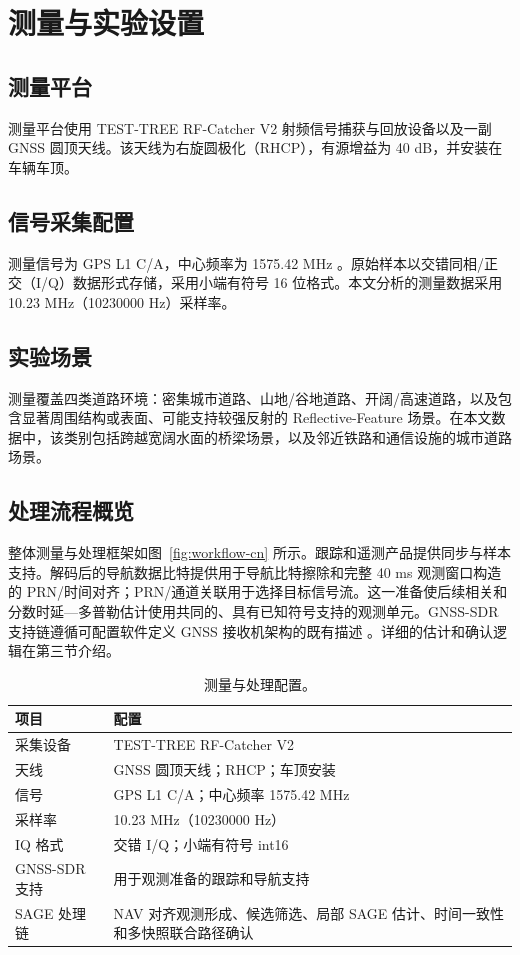 \documentclass[conference]{IEEEtran}
\begin{document}
\section{测量与实验设置}
\subsection{测量平台}
测量平台使用 TEST-TREE RF-Catcher V2 射频信号捕获与回放设备以及一副 GNSS 圆顶天线。该天线为右旋圆极化（RHCP），有源增益为 40 dB，并安装在车辆车顶。

\subsection{信号采集配置}
测量信号为 GPS L1 C/A，中心频率为 1575.42 MHz \cite{gpsis200n2022}。原始样本以交错同相/正交（I/Q）数据形式存储，采用小端有符号 16 位格式。本文分析的测量数据采用 10.23 MHz（10230000 Hz）采样率。

\subsection{实验场景}
测量覆盖四类道路环境：密集城市道路、山地/谷地道路、开阔/高速道路，以及包含显著周围结构或表面、可能支持较强反射的 Reflective-Feature 场景。在本文数据中，该类别包括跨越宽阔水面的桥梁场景，以及邻近铁路和通信设施的城市道路场景。

\subsection{处理流程概览}
整体测量与处理框架如图~\ref{fig:workflow-cn} 所示。跟踪和遥测产品提供同步与样本支持。解码后的导航数据比特提供用于导航比特擦除和完整 40 ms 观测窗口构造的 PRN/时间对齐；PRN/通道关联用于选择目标信号流。这一准备使后续相关和分数时延—多普勒估计使用共同的、具有已知符号支持的观测单元。GNSS-SDR 支持链遵循可配置软件定义 GNSS 接收机架构的既有描述 \cite{fernandez2011gnsssdr}。详细的估计和确认逻辑在第三节介绍。

\begin{table}[t]
\centering
\caption{测量与处理配置。}
\label{tab:measurement-configuration-cn}
\scriptsize
\setlength{\tabcolsep}{3pt}
\begin{tabular}{p{}p{}}
\toprule
项目 & 配置\\
\midrule
采集设备 & TEST-TREE RF-Catcher V2\\
天线 & GNSS 圆顶天线；RHCP；车顶安装\\
信号 & GPS L1 C/A；中心频率 1575.42 MHz\\
采样率 & 10.23 MHz（10230000 Hz）\\
IQ 格式 & 交错 I/Q；小端有符号 int16\\
GNSS-SDR 支持 & 用于观测准备的跟踪和导航支持\\
SAGE 处理链 & NAV 对齐观测形成、候选筛选、局部 SAGE 估计、时间一致性和多快照联合路径确认\\
\bottomrule
\end{tabular}
\end{table}
\end{document}
